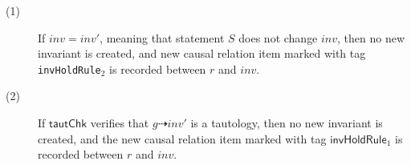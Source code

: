 \documentclass[conference]{IEEEtran}
\def \eqc {\doteq }
\def \andc {\barwedge }
\begin{document}
\begin{description}
\item[(1)] If $ inv=inv'$, meaning that statement $S$ does not change $inv$, then no new invariant is created, and  new causal
relation item marked with tag {\tt invHoldRule$_2$} is recorded
between $r$ and $inv$.%

\item[(2)] If $\mathsf{ tautChk}$ verifies that $g \dashrightarrow inv'$ is a tautology, then  no new invariant is created, and
the new causal relation item marked with tag
$ \mathsf{invHoldRule}_1$ is recorded between $r$ and $inv$. %



\end{description}
\end{document}

